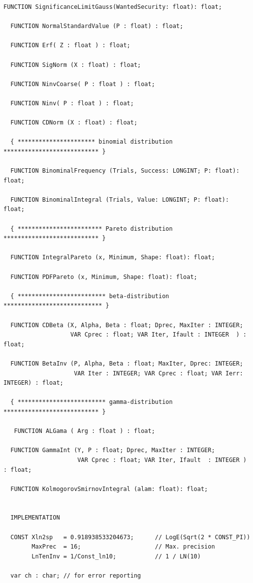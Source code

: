 \begin{refsection}
\begin{lstlisting}[caption=Interface of \texttt{Stat}]
  FUNCTION SignificanceLimitGauss(WantedSecurity: float): float;

  FUNCTION NormalStandardValue (P : float) : float;

  FUNCTION Erf( Z : float ) : float;

  FUNCTION SigNorm (X : float) : float;

  FUNCTION NinvCoarse( P : float ) : float;

  FUNCTION Ninv( P : float ) : float;

  FUNCTION CDNorm (X : float) : float;

  { ********************** binomial distribution *************************** }

  FUNCTION BinominalFrequency (Trials, Success: LONGINT; P: float): float;

  FUNCTION BinominalIntegral (Trials, Value: LONGINT; P: float): float;

  { ************************ Pareto distribution *************************** }

  FUNCTION IntegralPareto (x, Minimum, Shape: float): float;

  FUNCTION PDFPareto (x, Minimum, Shape: float): float;

  { ************************* beta-distribution **************************** }

  FUNCTION CDBeta (X, Alpha, Beta : float; Dprec, MaxIter : INTEGER;
                   VAR Cprec : float; VAR Iter, Ifault : INTEGER  ) : float;

  FUNCTION BetaInv (P, Alpha, Beta : float; MaxIter, Dprec: INTEGER;
                    VAR Iter : INTEGER; VAR Cprec : float; VAR Ierr: INTEGER) : float;

  { ************************* gamma-distribution *************************** }

   FUNCTION ALGama ( Arg : float ) : float;

  FUNCTION GammaInt (Y, P : float; Dprec, MaxIter : INTEGER;
                     VAR Cprec : float; VAR Iter, Ifault  : INTEGER ) : float;

  FUNCTION KolmogorovSmirnovIntegral (alam: float): float;


  IMPLEMENTATION

  CONST Xln2sp   = 0.918938533204673;      // LogE(Sqrt(2 * CONST_PI))
        MaxPrec  = 16;                     // Max. precision
        LnTenInv = 1/Const_ln10;           // 1 / LN(10)

  var ch : char; // for error reporting
\end{lstlisting}


\end{refsection}
